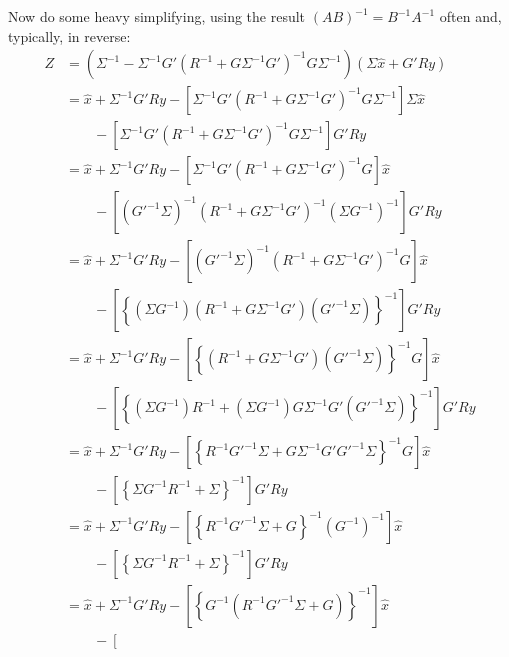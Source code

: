\documentclass[a4paper,12pt]{scrartcl}
\begin{document}
Now do some heavy simplifying, using the result $(AB)^{-1} = 
B^{-1} A^{-1}$ often and, typically, in reverse:
\begin{align*}
    Z &= 
	\left( \Sigma^{-1} - \Sigma^{-1} G'(R^{-1} 
	+ G\Sigma^{-1}G')^{-1}
	G\Sigma^{-1}\right) \left(\Sigma \hat{x} + G'Ry \right)\\
    &= \hat{x} 
	+ \Sigma^{-1} G'Ry
	- \left[\Sigma^{-1} G'(R^{-1} + G\Sigma^{-1}G')^{-1} 
	    G\Sigma^{-1}\right] \Sigma \hat{x} \\
    &\qquad - \left[\Sigma^{-1} G'(R^{-1} + G\Sigma^{-1}G')^{-1}
	    G\Sigma^{-1}\right] G'Ry \\
    &= \hat{x} 
	+ \Sigma^{-1} G'Ry
	- \left[\Sigma^{-1} G'(R^{-1} + G\Sigma^{-1}G')^{-1} 
	    G\right]  \hat{x} \\
	&\qquad - \left[\left(G'^{-1}\Sigma \right)^{-1}
	    (R^{-1} + G\Sigma^{-1}G')^{-1}
	    \left(\Sigma G^{-1}\right)^{-1}\right] G'Ry \\
    &= \hat{x} 
	+ \Sigma^{-1} G'Ry
	- \left[ ( G'^{-1} \Sigma)^{-1} (R^{-1} 
	    + G\Sigma^{-1}G')^{-1} G\right]  \hat{x} \\
	&\qquad - \left[
	    \left\{\left(\Sigma G^{-1}\right)
	    (R^{-1} + G\Sigma^{-1}G')
	    \left(G'^{-1}\Sigma \right)
	    \right\}^{-1} \right] G'Ry \\
    &= \hat{x} 
	+ \Sigma^{-1} G'Ry
	- \left[\left\{ (R^{-1} 
	    + G\Sigma^{-1}G')
	    ( G'^{-1} \Sigma) \right\}^{-1} G\right]  \hat{x} \\
	&\qquad - \left[
	    \left\{\left(\Sigma G^{-1}\right)
	    R^{-1} + \left(\Sigma G^{-1}\right)G\Sigma^{-1}G'
	    \left(G'^{-1}\Sigma \right)
	    \right\}^{-1} \right] G'Ry \\
    &= \hat{x} 
	+ \Sigma^{-1} G'Ry
	- \left[\left\{ R^{-1} G'^{-1} \Sigma
	    + G\Sigma^{-1}G' G'^{-1} \Sigma
	     \right\}^{-1} G\right]  \hat{x} \\
	&\qquad - \left[
	    \left\{ \Sigma G^{-1}
	    R^{-1} + \Sigma 
	    \right\}^{-1} \right] G'Ry \\
    &= \hat{x} 
	+ \Sigma^{-1} G'Ry
	- \left[\left\{ R^{-1} G'^{-1} \Sigma
	+ G \right\}^{-1} \left(G^{-1}\right)^{-1}
	    \right]  \hat{x} \\
	&\qquad - \left[
	    \left\{ \Sigma G^{-1}
	    R^{-1} + \Sigma 
	    \right\}^{-1} \right] G'Ry \\
    &= \hat{x} 
	+ \Sigma^{-1} G'Ry
	- \left[\left\{ G^{-1}\left(R^{-1} G'^{-1} \Sigma
	+ G\right) \right\}^{-1}
	    \right]  \hat{x} \\
	&\qquad - \left[

\end{align*}
\end{document}
